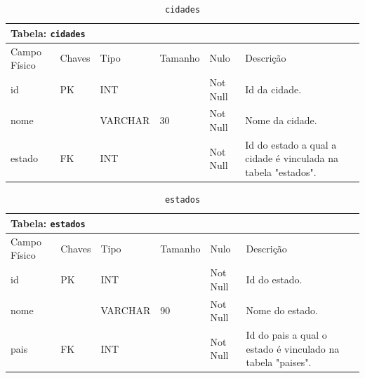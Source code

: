 \documentclass[12pt,a4paper]{article}
\begin{document}
\begin{center}
\begin{table}[h!]
	\caption{\texttt{cidades}}
	\label{tabela:cidades}
	\begin{tabular}{|p{2.3cm}|p{1.2cm}|p{1.8cm}|p{1.5cm}|p{1cm}|p{6cm}|}\hline		
		\multicolumn{6}{|p{16cm}|}{\cellcolor{cinzaClaro}  \centering Tabela: \texttt{cidades}} \\ \hline %
		{\small Campo Físico}   & {\small Chaves} & {\small Tipo} & {\small Tamanho} & {\small Nulo} & {\small Descrição}\\\hline %
		
		{\tiny id} & {\tiny PK} & {\tiny INT} & {\tiny } & {\tiny Not Null} &{\tiny Id da cidade.}\\\hline
		{\tiny nome} & {\tiny } & {\tiny VARCHAR} & {\tiny 30} & {\tiny Not Null} &{\tiny Nome da cidade.}\\\hline
		{\tiny estado} & {\tiny FK} & {\tiny INT} & {\tiny } & {\tiny Not Null} &{\tiny Id do estado a qual a cidade é vinculada na tabela "estados".}\\\hline
		
			
	\end{tabular}
\end{table}	
\end{center}

\begin{center}
\begin{table}[h!]
	\caption{\texttt{estados}}
	\label{tabela:estados}
	\begin{tabular}{|p{2.3cm}|p{1.2cm}|p{1.8cm}|p{1.5cm}|p{1cm}|p{6cm}|}\hline		
		\multicolumn{6}{|p{16cm}|}{\cellcolor{cinzaClaro}  \centering Tabela: \texttt{estados}} \\ \hline %
		{\small Campo Físico}   & {\small Chaves} & {\small Tipo} & {\small Tamanho} & {\small Nulo} & {\small Descrição}\\\hline %
		
		{\tiny id} & {\tiny PK} & {\tiny INT} & {\tiny } & {\tiny Not Null} &{\tiny Id do estado.}\\\hline
		{\tiny nome} & {\tiny } & {\tiny VARCHAR} & {\tiny 90} & {\tiny Not Null} &{\tiny Nome do estado.}\\\hline
		{\tiny pais} & {\tiny FK} & {\tiny INT} & {\tiny } & {\tiny Not Null} &{\tiny Id do pais a qual o estado é vinculado na tabela "paises".}\\\hline
			
	\end{tabular}
\end{table}	
\end{center}
\end{document}
